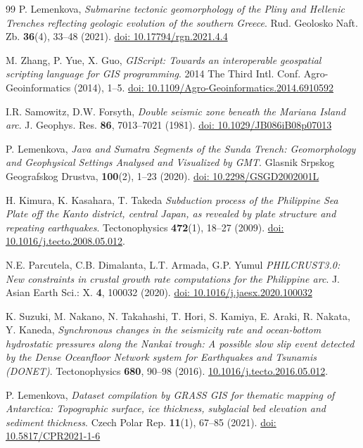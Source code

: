 \documentclass{rrparticle}
\begin{document}
\begin{thebibliography}{99}
 P. Lemenkova, \emph{Submarine tectonic geomorphology of the Pliny and Hellenic Trenches reflecting geologic evolution of the southern Greece}. Rud. Geolosko Naft. Zb. \textbf{36}(4), 33--48 (2021). \href{https://doi.org/10.17794/rgn.2021.4.4}{doi: 10.17794/rgn.2021.4.4}

 M. Zhang, P. Yue, X. Guo, \emph{GIScript: Towards an interoperable geospatial scripting language for GIS programming}. 2014 The Third Intl. Conf. Agro-Geoinformatics (2014), 1--5.  \href{https://doi.org/10.1109/Agro-Geoinformatics.2014.6910592}{doi: 10.1109/Agro-Geoinformatics.2014.6910592}

 I.R. Samowitz, D.W. Forsyth, \emph{Double seismic zone beneath the Mariana Island arc}. J. Geophys. Res. \textbf{86}, 7013--7021 (1981). \href{https://doi.org/10.1029/JB086iB08p07013}{doi: 10.1029/JB086iB08p07013}

 P. Lemenkova, \emph{Java and Sumatra Segments of the Sunda Trench: Geomorphology and Geophysical Settings Analysed and Visualized by GMT}. Glasnik Srpskog Geografskog Drustva, \textbf{100}(2), 1--23 (2020). \href{https://doi.org/10.2298/GSGD2002001L}{doi: 10.2298/GSGD2002001L}

 H. Kimura, K. Kasahara, T. Takeda \emph{Subduction process of the Philippine Sea Plate off the Kanto district, central Japan, as revealed by plate structure and repeating earthquakes}. Tectonophysics \textbf{472}(1), 18--27 (2009). \href{https://doi.org/10.1016/j.tecto.2008.05.012}{doi: 10.1016/j.tecto.2008.05.012}.

 N.E. Parcutela, C.B. Dimalanta, L.T. Armada, G.P. Yumul \emph{PHILCRUST3.0: New constraints in crustal growth rate computations for the Philippine arc}. J. Asian Earth Sci.: X. \textbf{4}, 100032 (2020). \href{https://doi.org/10.1016/j.jaesx.2020.100032}{doi: 10.1016/j.jaesx.2020.100032}

 K. Suzuki, M. Nakano, N. Takahashi, T. Hori, S. Kamiya, E. Araki, R. Nakata, Y. Kaneda, \emph{Synchronous changes in the seismicity rate and ocean-bottom hydrostatic pressures along the Nankai trough: A possible slow slip event detected by the Dense Oceanfloor Network system for Earthquakes and Tsunamis (DONET)}. Tectonophysics \textbf{680}, 90--98 (2016). \href{https://doi.org/10.1016/j.tecto.2016.05.012}{10.1016/j.tecto.2016.05.012}.

 P. Lemenkova, \emph{Dataset compilation by GRASS GIS for thematic mapping of Antarctica: Topographic surface, ice thickness, subglacial bed elevation and sediment thickness}. Czech Polar Rep. \textbf{11}(1), 67--85 (2021). \href{https://doi.org/10.5817/CPR2021-1-6}{doi: 10.5817/CPR2021-1-6}


\end{thebibliography}
\end{document}

